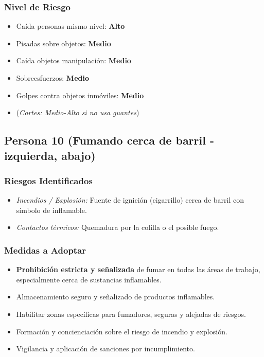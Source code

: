 \documentclass[12pt,a4paper]{article}
\begin{document}
	\subsubsection{Nivel de Riesgo}
	\begin{itemize}
		\item Caída personas mismo nivel: \textbf{Alto}
		\item Pisadas sobre objetos: \textbf{Medio}
		\item Caída objetos manipulación: \textbf{Medio}
		\item Sobreesfuerzos: \textbf{Medio}
		\item Golpes contra objetos inmóviles: \textbf{Medio}
		\item (\textit{Cortes: Medio-Alto si no usa guantes})
	\end{itemize}
	
	\bigskip\hrulefill\bigskip
	
	\subsection{Persona 10 (Fumando cerca de barril - izquierda, abajo)}
	
	\subsubsection{Riesgos Identificados}
	\begin{itemize}
		\item \textit{Incendios / Explosión:} Fuente de ignición (cigarrillo) cerca de barril con símbolo de inflamable.
		\item \textit{Contactos térmicos:} Quemadura por la colilla o el posible fuego.
	\end{itemize}
	
	\subsubsection{Medidas a Adoptar}
	\begin{itemize}
		\item \textbf{Prohibición estricta y señalizada} de fumar en todas las áreas de trabajo, especialmente cerca de sustancias inflamables.
		\item Almacenamiento seguro y señalizado de productos inflamables.
		\item Habilitar zonas específicas para fumadores, seguras y alejadas de riesgos.
		\item Formación y concienciación sobre el riesgo de incendio y explosión.
		\item Vigilancia y aplicación de sanciones por incumplimiento.
	\end{itemize}
	
\end{document}

